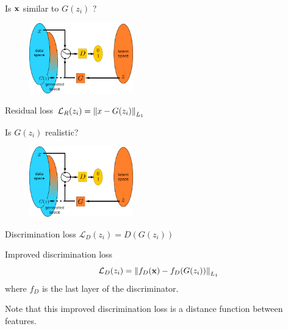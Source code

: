 \documentclass[xcolor=pdftex,dvipsnames,table,mathserif]{beamer}
\begin{document}
\begin{frame}{Is $\mathbf{x}$ similar to $G(z_i)$ ?}

  \begin{figure}[ht]
    \centering
    \includegraphics[width=0.4\textwidth]{gan2}
  \end{figure}

  \begin{block}{Residual loss}
    \centering
    $\mathcal{L}_R(z_i) = \norm{x - G(z_i)}_{L_1}$
  \end{block}

\end{frame}


\begin{frame}{Is $G(z_i)$ realistic?}

  \begin{figure}[ht]
    \centering
    \includegraphics[width=0.4\textwidth]{gan2}
  \end{figure}

  \begin{block}{Discrimination loss}
    \centering
    $\mathcal{L}_D(z_i) = D(G(z_i))$
  \end{block}

  \begin{block}{Improved discrimination loss}
    \[\mathcal{L}_D(z_i) = \norm{f_D(\mathbf{x}) - f_D(G(z_i))}_{L_1}\]
    where $f_D$ is the last layer of the discriminator.
  \end{block}

  Note that this improved discrimination loss is a distance function between features.

\end{frame}
\end{document}
